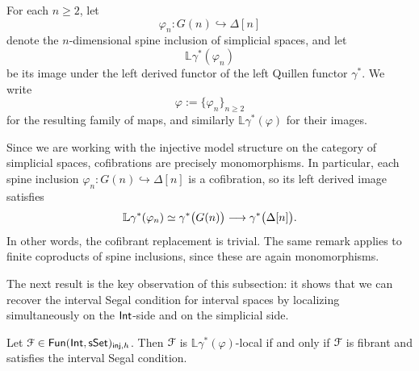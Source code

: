 \begin{definition}
    For each $n\geq 2$, let
    \begin{equation}
      \varphi_n\colon G(n) \hookrightarrow \Delta[n]
    \end{equation}
    denote the $n$-dimensional spine inclusion of simplicial spaces, and let
    \begin{equation}
      \mathbb{L}\gamma^{*}(\varphi_n)
    \end{equation}
    be its image under the left derived functor of the left Quillen functor
    $\gamma^{*}$. We write
    \begin{equation}
      \varphi := \{\varphi_n\}_{n\geq 2}
    \end{equation}
    for the resulting family of maps, and similarly
    $\mathbb{L}\gamma^{*}(\varphi)$ for their images.
\end{definition}

\begin{observation}
    Since we are working with the injective model structure on the category of
    simplicial spaces, cofibrations are precisely monomorphisms. In particular,
    each spine inclusion $\varphi_n\colon G(n)\hookrightarrow\Delta[n]$ is a
    cofibration, so its left derived image satisfies
    \begin{equation}
        \mathbb{L}\gamma^*(\varphi_n)
        \simeq
        \gamma^*\big(G(n)\big) \longrightarrow \gamma^*\big(\Delta[n]\big).
    \end{equation}
    In other words, the cofibrant replacement is trivial. The same remark
    applies to finite coproducts of spine inclusions, since these are again
    monomorphisms.
\end{observation}

The next result is the key observation of this subsection: it shows that we can
recover the interval Segal condition for interval spaces by localizing
simultaneously on the $\operatorname{\mathsf{Int}}$-side and on the simplicial side.

\begin{lemma}\label{ch2:: lem: fibrant Segal condition}
Let $\mathcal F\in \operatorname{\sf Fun}(\operatorname{\mathsf{Int}},\operatorname{\sf sSet})_{\mathsf{inj},h}$. Then $\mathcal F$ is
$\mathbb{L}\gamma^{*}(\varphi)$-local if and only if $\mathcal F$ is fibrant and
satisfies the interval Segal condition.
\end{lemma}

